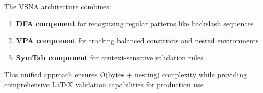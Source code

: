 \documentclass[12pt]{article}
\begin{document}
The VSNA architecture combines:
\begin{enumerate}
\item \textbf{DFA component} for recognizing regular patterns like backslash sequences
\item \textbf{VPA component} for tracking balanced constructs and nested environments  
\item \textbf{SymTab component} for context-sensitive validation rules
\end{enumerate}

This unified approach ensures O(bytes + nesting) complexity while providing comprehensive LaTeX validation capabilities for production use.
\end{document}

